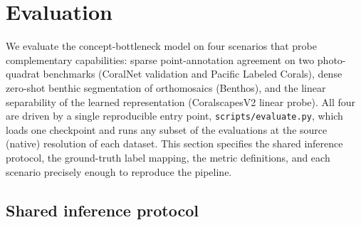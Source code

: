 
\section{Evaluation}
\label{sec:evaluation}

We evaluate the concept-bottleneck model on four scenarios that probe
complementary capabilities: sparse point-annotation agreement on two
photo-quadrat benchmarks (CoralNet validation and Pacific Labeled Corals), dense
zero-shot benthic segmentation of orthomosaics (Benthos), and the linear
separability of the learned representation (CoralscapesV2 linear probe). All four
are driven by a single reproducible entry point,
\texttt{scripts/evaluate.py}, which loads one checkpoint and runs any subset of
the evaluations at the source (native) resolution of each dataset. This section
specifies the shared inference protocol, the ground-truth label mapping, the
metric definitions, and each scenario precisely enough to reproduce the
pipeline.

\subsection{Shared inference protocol}
\label{sec:eval-protocol}

